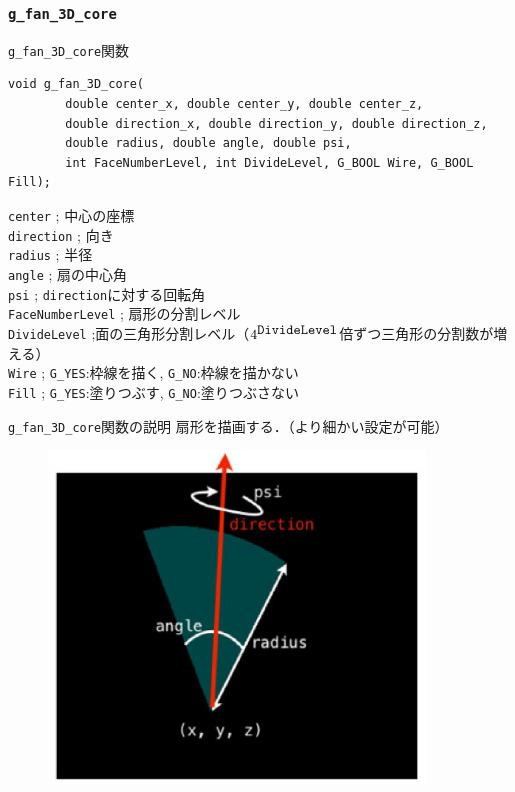 \documentclass[platex,a4paper,12pt]{jsarticle}%
\begin{document}
\clearpage
\subsubsection{\texttt{g\_fan\_3D\_core}}

\begin{itembox}[l]{\texttt{g\_fan\_3D\_core}関数}
\begin{verbatim}
void g_fan_3D_core(
        double center_x, double center_y, double center_z,
        double direction_x, double direction_y, double direction_z,
        double radius, double angle, double psi,
        int FaceNumberLevel, int DivideLevel, G_BOOL Wire, G_BOOL Fill);
\end{verbatim}
\verb|center| ; 中心の座標\\
\verb|direction| ; 向き\\
\verb|radius| ; 半径\\
\verb|angle| ; 扇の中心角\\
\verb|psi| ; \verb|direction|に対する回転角\\
\verb|FaceNumberLevel| ; 扇形の分割レベル\\
\verb|DivideLevel| ;面の三角形分割レベル（$4^{\verb|DivideLevel|}$倍ずつ三角形の分割数が増える）\\
\verb|Wire| ; \verb|G_YES|:枠線を描く, \verb|G_NO|:枠線を描かない \\
\verb|Fill| ; \verb|G_YES|:塗りつぶす, \verb|G_NO|:塗りつぶさない 
\end{itembox}

\begin{itembox}[l]{\texttt{g\_fan\_3D\_core}関数の説明}
扇形を描画する．（より細かい設定が可能）
\end{itembox}
\begin{figure}[htb]
\centering
	\includegraphics[width=100mm]{./Figures/eps/Canvas_g_fan.eps}
\end{figure}
\end{document}
